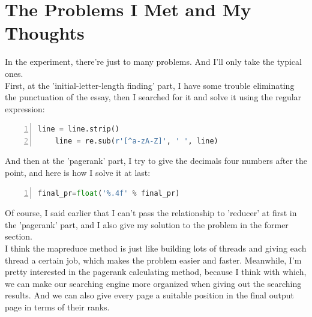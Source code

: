 \documentclass{article}
\begin{document}
\section{The Problems I Met and My Thoughts}
In the experiment, there're just to many problems. And I'll only take the typical ones.\\
First, at the 'initial-letter-length finding' part, I have some trouble eliminating the punctuation of the essay, then I searched for it and solve it using the regular expression:\\
\begin{lstlisting}[language=python,numbers=left,frame=leftline]
    line = line.strip()
    line = re.sub(r'[^a-zA-Z]', ' ', line)
\end{lstlisting}
And then at the 'pagerank' part, I try to give the decimals four numbers after the point, and here is how I solve it at last:\\
\begin{lstlisting}[language=python,numbers=left,frame=leftline]
final_pr=float('%.4f' % final_pr)
\end{lstlisting}
Of course, I said earlier that I can't pass the relationship to 'reducer' at first in the 'pagerank' part, and I also give my solution to the problem in the former section.\\
I think the mapreduce method is just like building lots of threads and giving each thread a certain job, which makes the problem easier and faster. Meanwhile, I'm pretty interested in the pagerank calculating method, because I think with which, we can make our searching engine more organized when giving out the searching results. And we can also give every page a suitable position in the final output page in terms of their ranks.
\end{document}
